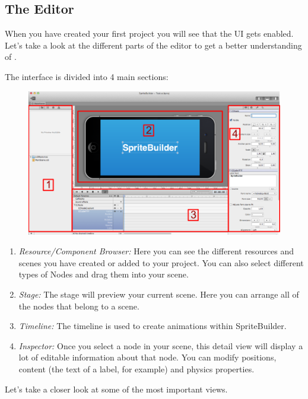 \subsection{The Editor}
When you have created your first \SB{} project you will see that the \SB{} UI
gets enabled. Let's take a look at the different parts of the editor to get a
better understanding of \SB{}.

The \SB{} interface is divided into 4 main sections:
\begin{figure}[H]
		\centering
		\includegraphics[width=0.9\linewidth]{images/spritebuilder/spritebuilder_ui.png}     
\end{figure} 
\begin{enumerate}
  \item \textit{Resource/Component Browser:} Here you can see the different
  resources and scenes you have created or added to your project. You can also select different types of Nodes and drag them into your scene.
  \item \textit{Stage:} The stage will preview your current scene. Here you can
  arrange all of the nodes that belong to a scene. 
  \item \textit{Timeline:} The timeline is used to create animations within
  SpriteBuilder.
  \item \textit{Inspector:} Once you select a node in your scene, this detail
  view will display a lot of editable information about that node. You can modify positions, content (the text of a label, for example) and physics properties.
\end{enumerate}
Let's take a closer look at some of the most important views.

